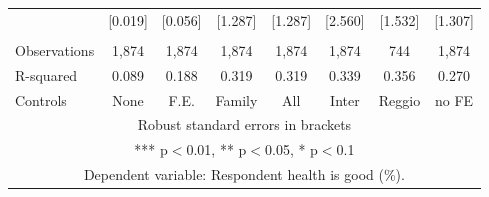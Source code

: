 \begin{tabular}{lccccccc}
 & [0.019] & [0.056] & [1.287] & [1.287] & [2.560] & [1.532] & [1.307] \\
 &  &  &  &  &  &  &  \\
Observations & 1,874 & 1,874 & 1,874 & 1,874 & 1,874 & 744 & 1,874 \\
R-squared & 0.089 & 0.188 & 0.319 & 0.319 & 0.339 & 0.356 & 0.270 \\
 Controls & None & F.E. & Family & All & Inter & Reggio & no FE \\ \hline
\multicolumn{8}{c}{ Robust standard errors in brackets} \\
\multicolumn{8}{c}{ *** p$<$0.01, ** p$<$0.05, * p$<$0.1} \\
\multicolumn{8}{c}{ Dependent variable: Respondent health is good (\%).} \\
\end{tabular}
